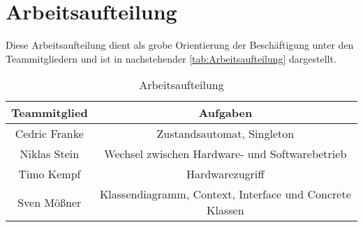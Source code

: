 \chapter{Arbeitsaufteilung}

Diese Arbeitsaufteilung dient als grobe Orientierung der Beschäftigung unter den Teammitgliedern und ist in nachstehender \autoref{tab:Arbeitsaufteilung} dargestellt.\

\begin{table}[H] 
	\centering
	\begin{tabular}[H]{c|c} \label{tab2}
		Teammitglied & Aufgaben \\
		\hline
		Cedric Franke & Zustandsautomat, Singleton\\
		Niklas Stein &  Wechsel zwischen Hardware- und Softwarebetrieb \\
		Timo Kempf & Hardwarezugriff  \\
		Sven Mößner & Klassendiagramm, Context, Interface und Concrete Klassen \\
	\end{tabular}
	\caption{Arbeitsaufteilung}
	\label{tab:Arbeitsaufteilung}
\end{table}